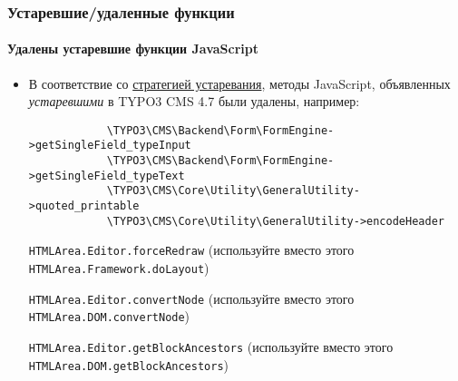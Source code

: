 \begin{frame}[fragile]
	\frametitle{Устаревшие/удаленные функции}
	\framesubtitle{Удалены устаревшие функции JavaScript}

	\begin{itemize}
		\item В соответствие со \href{http://forge.typo3.org/projects/typo3v4-core/wiki/CoreDevPolicy}{стратегией устаревания},
			методы JavaScript, объявленных \textit{устаревшими} в TYPO3 CMS 4.7 были удалены, например:

		\begin{lstlisting}
			\TYPO3\CMS\Backend\Form\FormEngine->getSingleField_typeInput
			\TYPO3\CMS\Backend\Form\FormEngine->getSingleField_typeText
			\TYPO3\CMS\Core\Utility\GeneralUtility->quoted_printable
			\TYPO3\CMS\Core\Utility\GeneralUtility->encodeHeader
		\end{lstlisting}

		\smaller
			\texttt{HTMLArea.Editor.forceRedraw}\newline
				(используйте вместо этого \texttt{HTMLArea.Framework.doLayout})
				\vspace{0.2cm}

			\texttt{HTMLArea.Editor.convertNode}\newline
				(используйте вместо этого \texttt{HTMLArea.DOM.convertNode})
				\vspace{0.2cm}

			\texttt{HTMLArea.Editor.getBlockAncestors}\newline
				(используйте вместо этого \texttt{HTMLArea.DOM.getBlockAncestors})
		\normalsize

	\end{itemize}

\end{frame}


